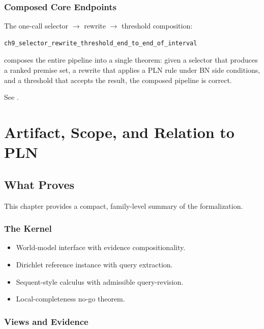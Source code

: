 \documentclass[11pt,openany]{report}
\begin{document}
\section{Composed Core Endpoints}

The one-call selector $\to$ rewrite $\to$ threshold composition:
\begin{lstlisting}
ch9_selector_rewrite_threshold_end_to_end_of_interval
\end{lstlisting}

composes the entire pipeline into a single theorem: given a selector that
produces a ranked premise set, a rewrite that applies a PLN rule under
BN side conditions, and a threshold that accepts the result, the composed
pipeline is correct.

See .


\part{Artifact, Scope, and Relation to PLN}
\label{part:artifact}

\chapter{What \xiPLN{} Proves}
\label{ch:what-proved}

This chapter provides a compact, family-level summary of the formalization.

\section{The Kernel}

\begin{itemize}
\item World-model interface with evidence compositionality.
\item Dirichlet reference instance with query extraction.
\item Sequent-style calculus with admissible query-revision.
\item Local-completeness no-go theorem.
\end{itemize}

\section{Views and Evidence}
\end{document}
